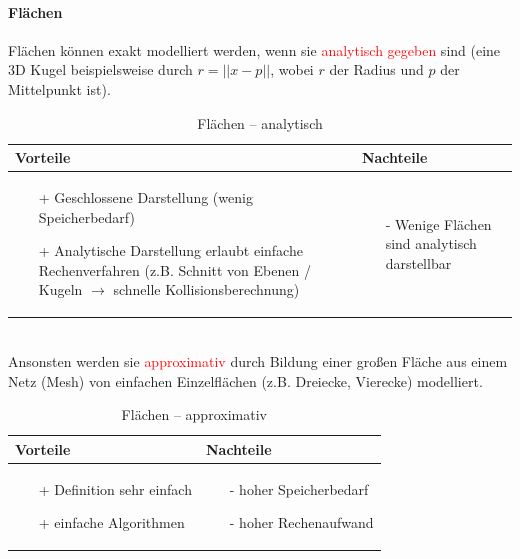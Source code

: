 \paragraph*{Flächen}
Flächen können exakt modelliert werden, wenn sie \textcolor{red}{analytisch gegeben} sind (eine 3D Kugel beispielsweise durch $r = ||x-p||$, wobei $r$ der Radius und $p$ der Mittelpunkt ist).
\begin{table}[hbt]
\centering
\begin{tabular}{|p{6.5cm}|p{6.5cm}|}
\hline
Vorteile & Nachteile\\
\hline
\vspace{-5mm}
\begin{itemize}
\setlength\itemsep{0em}
\item[+] Geschlossene Darstellung (wenig Speicherbedarf)
\item[+] Analytische Darstellung erlaubt einfache Rechenverfahren (z.B.
Schnitt von Ebenen / Kugeln $\rightarrow$ schnelle Kollisionsberechnung)
\end{itemize}
 &
 \vspace{-5mm}
\begin{itemize}
\setlength\itemsep{0em}
\item[-] Wenige Flächen sind analytisch darstellbar
\end{itemize}\\
\hline
\end{tabular}
\caption{Flächen -- analytisch}
\label{tab:Flaechen-analyt}
\end{table}\\ 
Ansonsten werden sie \textcolor{red}{approximativ} durch Bildung einer großen Fläche aus einem Netz (\glqq Mesh\grqq ) von einfachen Einzelflächen (z.B. Dreiecke, Vierecke) modelliert.\\
\begin{table}[hbt]
\centering
\begin{tabular}{|p{6.5cm}|p{6.5cm}|}
\hline
Vorteile & Nachteile\\
\hline
\vspace{-5mm}
\begin{itemize}
\setlength\itemsep{0em}
\item[+] Definition sehr einfach
\item[+] einfache Algorithmen
\end{itemize}
 &
 \vspace{-5mm}
\begin{itemize}
\setlength\itemsep{0em}
\item[-] hoher Speicherbedarf
\item[-] hoher Rechenaufwand
\end{itemize}\\
\hline
\end{tabular}
\caption{Flächen -- approximativ}
\label{tab:Flaechen_approx}
\end{table}\\ 
